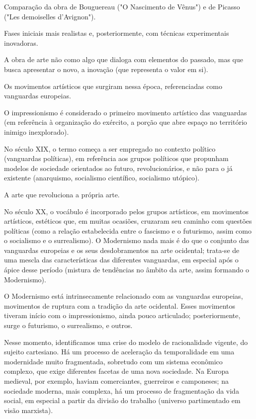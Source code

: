 Comparação da obra de Bouguereau ("O Nascimento de Vênus") e de Picasso ("Les demoiselles d'Avignon").

Fases iniciais mais realistas e, posteriormente, com técnicas experimentais inovadoras.

A obra de arte não como algo que dialoga com elementos do passado, mas que busca apresentar o novo, a inovação (que representa o valor em si).

Os movimentos artísticos que surgiram nessa época, referenciadas como vanguardas europeias.

O impressionismo é considerado o primeiro movimento artístico das vanguardas (em referência à organização do exército, a porção que abre espaço no território inimigo inexplorado).

No século XIX, o termo começa a ser empregado no contexto político (vanguardas políticas), em referência aos grupos políticos que propunham modelos de sociedade orientados ao futuro, revolucionários, e não para o já existente (anarquismo, socialismo científico, socialismo utópico).

A arte que revoluciona a própria arte.

No século XX, o vocábulo é incorporado pelos grupos artísticos, em movimentos artísticos, estéticos que, em muitas ocasiões, cruzaram seu caminho com questões políticas (como a relação estabelecida entre o fascismo e o futurismo, assim como o socialismo e o surrealismo). O Modernismo nada mais é do que o conjunto das vanguardas europeias e os seus desdobramentos na arte ocidental; trata-se de uma mescla das características das diferentes vanguardas, em especial após o ápice desse período (mistura de tendências no âmbito da arte, assim formando o Modernismo).

O Modernismo está intrinsecamente relacionado com as vanguardas europeias, movimentos de ruptura com a tradição da arte ocidental. Esses movimentos tiveram início com o impressionismo, ainda pouco articulado; posteriormente, surge o futurismo, o surrealismo, e outros.

Nesse momento, identificamos uma crise do modelo de racionalidade vigente, do sujeito cartesiano. Há um processo de aceleração da temporalidade em uma modernidade muito fragmentada, sobretudo com um sistema econômico complexo, que exige diferentes facetas de uma nova sociedade. Na Europa medieval, por exemplo, haviam comerciantes, guerreiros e camponeses; na sociedade moderna, mais complexa, há um processo de fragmentação da vida social, em especial a partir da divisão do trabalho (universo partimentado em visão marxista).

